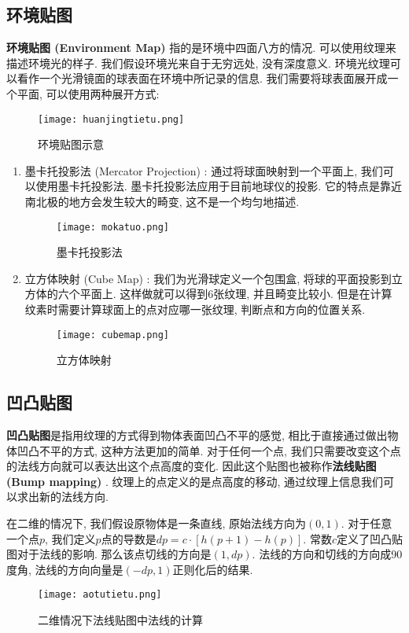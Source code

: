 \subsection{环境贴图}
\textbf{环境贴图 (Environment Map) }指的是环境中四面八方的情况. 可以使用纹理来描述环境光的样子. 我们假设环境光来自于无穷远处, 没有深度意义. 环境光纹理可以看作一个光滑镜面的球表面在环境中所记录的信息. 我们需要将球表面展开成一个平面, 可以使用两种展开方式: 
\begin{figure}[H]
	\centering
	\texttt{[image: huanjingtietu.png]}
	\caption{环境贴图示意}
	\label{fig:huanjingtietu}
\end{figure}
\begin{enumerate}
	\item 墨卡托投影法 (Mercator Projection) : 通过将球面映射到一个平面上, 我们可以使用墨卡托投影法. 墨卡托投影法应用于目前地球仪的投影. 它的特点是靠近南北极的地方会发生较大的畸变, 这不是一个均匀地描述. 
	\begin{figure}[H]
		\centering
		\texttt{[image: mokatuo.png]}
		\caption{墨卡托投影法}
		\label{fig:mokatuo}
	\end{figure}
	\item 立方体映射 (Cube Map) : 我们为光滑球定义一个包围盒, 将球的平面投影到立方体的六个平面上. 这样做就可以得到6张纹理, 并且畸变比较小. 但是在计算纹素时需要计算球面上的点对应哪一张纹理, 判断点和方向的位置关系. 
	\begin{figure}[H]
	\centering
	\texttt{[image: cubemap.png]}
	\caption{立方体映射}
	\label{fig:cubemap}
	\end{figure}
\end{enumerate}

\subsection{凹凸贴图}
\textbf{凹凸贴图}是指用纹理的方式得到物体表面凹凸不平的感觉, 相比于直接通过做出物体凹凸不平的方式, 这种方法更加的简单. 对于任何一个点, 我们只需要改变这个点的法线方向就可以表达出这个点高度的变化. 因此这个贴图也被称作\textbf{法线贴图 (Bump mapping) }. 纹理上的点定义的是点高度的移动, 通过纹理上信息我们可以求出新的法线方向. 

在二维的情况下, 我们假设原物体是一条直线, 原始法线方向为$(0,1)$. 对于任意一个点$p$, 我们定义$p$点的导数是$dp=c\cdot [h(p+1)-h(p)]$. 常数$c$定义了凹凸贴图对于法线的影响. 那么该点切线的方向是$(1, dp)$. 法线的方向和切线的方向成90度角, 法线的方向向量是$(-dp, 1)$正则化后的结果. 
\begin{figure}[H]
	\centering
	\texttt{[image: aotutietu.png]}
	\caption{二维情况下法线贴图中法线的计算}
	\label{fig:aotu}
\end{figure}

